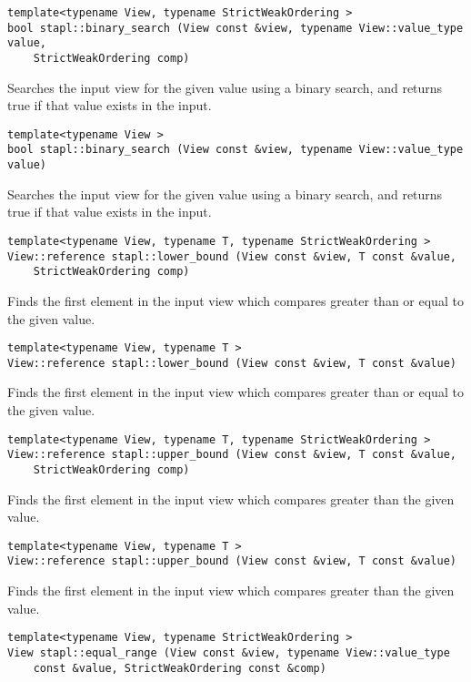 \begin{verbatim}
template<typename View, typename StrictWeakOrdering >
bool stapl::binary_search (View const &view, typename View::value_type value,
    StrictWeakOrdering comp)
\end{verbatim}

Searches the input view for the given value using a binary search, and returns true if that value exists in the input.

\begin{verbatim}
template<typename View >
bool stapl::binary_search (View const &view, typename View::value_type value)
\end{verbatim}

Searches the input view for the given value using a binary search, and returns true if that value exists in the input.

\begin{verbatim}
template<typename View, typename T, typename StrictWeakOrdering >
View::reference stapl::lower_bound (View const &view, T const &value,
    StrictWeakOrdering comp)
\end{verbatim}

Finds the first element in the input view which compares greater than or equal to the given value.

\begin{verbatim}
template<typename View, typename T >
View::reference stapl::lower_bound (View const &view, T const &value)
\end{verbatim}

Finds the first element in the input view which compares greater than or equal to the given value.

\begin{verbatim}
template<typename View, typename T, typename StrictWeakOrdering >
View::reference stapl::upper_bound (View const &view, T const &value,
    StrictWeakOrdering comp)
\end{verbatim}

Finds the first element in the input view which compares greater than the given value.

\begin{verbatim}
template<typename View, typename T >
View::reference stapl::upper_bound (View const &view, T const &value)
\end{verbatim}

Finds the first element in the input view which compares greater than the given value.

\begin{verbatim}
template<typename View, typename StrictWeakOrdering >
View stapl::equal_range (View const &view, typename View::value_type
    const &value, StrictWeakOrdering const &comp)
\end{verbatim}

